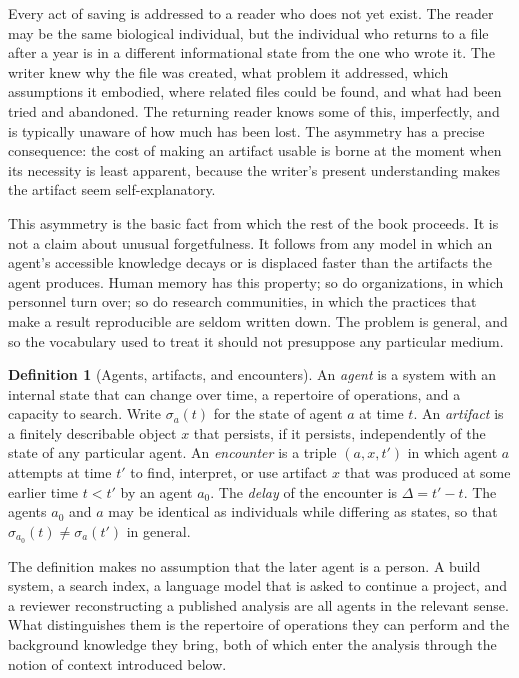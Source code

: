 \documentclass[11pt,twoside,openright]{book}
\theoremstyle{plain}
\theoremstyle{definition}
\newtheorem{definition}[theorem]{Definition}
\theoremstyle{remark}
\begin{document}
Every act of saving is addressed to a reader who does not yet exist. The reader may be the same biological individual, but the individual who returns to a file after a year is in a different informational state from the one who wrote it. The writer knew why the file was created, what problem it addressed, which assumptions it embodied, where related files could be found, and what had been tried and abandoned. The returning reader knows some of this, imperfectly, and is typically unaware of how much has been lost. The asymmetry has a precise consequence: the cost of making an artifact usable is borne at the moment when its necessity is least apparent, because the writer's present understanding makes the artifact seem self-explanatory.

This asymmetry is the basic fact from which the rest of the book proceeds. It is not a claim about unusual forgetfulness. It follows from any model in which an agent's accessible knowledge decays or is displaced faster than the artifacts the agent produces. Human memory has this property; so do organizations, in which personnel turn over; so do research communities, in which the practices that make a result reproducible are seldom written down. The problem is general, and so the vocabulary used to treat it should not presuppose any particular medium.

\begin{definition}[Agents, artifacts, and encounters]\label{def:encounter}
An \emph{agent} is a system with an internal state that can change over time, a repertoire of operations, and a capacity to search. Write $\sigma_a(t)$ for the state of agent $a$ at time $t$. An \emph{artifact} is a finitely describable object $x$ that persists, if it persists, independently of the state of any particular agent. An \emph{encounter} is a triple $(a,x,t')$ in which agent $a$ attempts at time $t'$ to find, interpret, or use artifact $x$ that was produced at some earlier time $t<t'$ by an agent $a_0$. The \emph{delay} of the encounter is $\Delta=t'-t$. The agents $a_0$ and $a$ may be identical as individuals while differing as states, so that $\sigma_{a_0}(t)\neq\sigma_a(t')$ in general.
\end{definition}

The definition makes no assumption that the later agent is a person. A build system, a search index, a language model that is asked to continue a project, and a reviewer reconstructing a published analysis are all agents in the relevant sense. What distinguishes them is the repertoire of operations they can perform and the background knowledge they bring, both of which enter the analysis through the notion of context introduced below.
\end{document}
